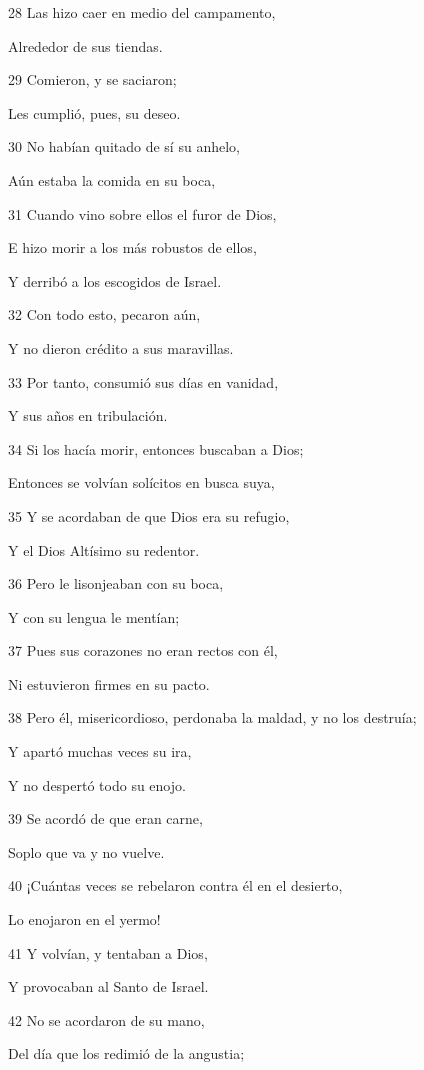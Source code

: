 \par 28 Las hizo caer en medio del campamento,
\par Alrededor de sus tiendas.
\par 29 Comieron, y se saciaron;
\par Les cumplió, pues, su deseo.
\par 30 No habían quitado de sí su anhelo,
\par Aún estaba la comida en su boca,
\par 31 Cuando vino sobre ellos el furor de Dios,
\par E hizo morir a los más robustos de ellos,
\par Y derribó a los escogidos de Israel.
\par 32 Con todo esto, pecaron aún,
\par Y no dieron crédito a sus maravillas.
\par 33 Por tanto, consumió sus días en vanidad,
\par Y sus años en tribulación.
\par 34 Si los hacía morir, entonces buscaban a Dios;
\par Entonces se volvían solícitos en busca suya,
\par 35 Y se acordaban de que Dios era su refugio,
\par Y el Dios Altísimo su redentor.
\par 36 Pero le lisonjeaban con su boca,
\par Y con su lengua le mentían;
\par 37 Pues sus corazones no eran rectos con él,
\par Ni estuvieron firmes en su pacto.
\par 38 Pero él, misericordioso, perdonaba la maldad, y no los destruía;
\par Y apartó muchas veces su ira,
\par Y no despertó todo su enojo.
\par 39 Se acordó de que eran carne,
\par Soplo que va y no vuelve.
\par 40 ¡Cuántas veces se rebelaron contra él en el desierto,
\par Lo enojaron en el yermo!
\par 41 Y volvían, y tentaban a Dios,
\par Y provocaban al Santo de Israel.
\par 42 No se acordaron de su mano,
\par Del día que los redimió de la angustia;
